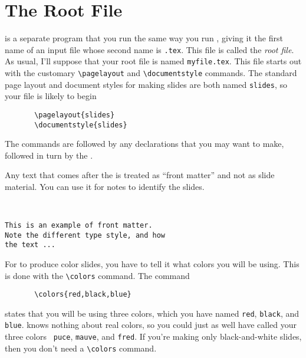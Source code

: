 \section{The Root File}

\SLITEX{} is a separate program that you run the same way you run
\LATEX{}, giving it the first name of an input file whose second name
is \xsp{}\mbox{\tt .tex}\Xsp.  This file is called the {\it root
 file}.  As usual, I'll suppose that your root file
is named \xsp{}\mbox{\tt myfile.tex}\Xsp.  This file
starts out with the customary
\xsp\hbox{\verb"\pagelayout"}\xsp{} 
and \linebreak %
\xsp{}\hbox{\verb"\documentstyle"}\xsp{}
commands.  The standard page layout and document styles for making
slides are both named \xsp{}\mbox{\tt slides}\Xsp, so your file is likely to begin
\begin{verbatim}
       \pagelayout{slides}
       \documentstyle{slides}
\end{verbatim}
The commands are followed by any declarations that you may want to
make, followed in turn by the \xsp{}\hbox{\verb""}\Xsp.

Any text that comes after the \xsp{}\hbox{\verb""}\xsp{}
is treated as
``front  matter''
and not as slide material.  You can use it for notes to
identify the slides.   
\begin{exambox}
\midbox
\begin{verbatim}


This is an example of front matter.
Note the different type style, and how 
the text ...
\end{verbatim}
\end{exambox}

For \SLITEX{} to produce color slides, you have to tell it what colors
you will be using.  This is done with the
\xsp{}\hbox{\verb"\colors"}\xsp{} command.  The command
\begin{verbatim}
       \colors{red,black,blue}
\end{verbatim}
states that you will be using three colors, which you have named
\xsp{}\mbox{\tt red}\Xsp, \xsp{}\mbox{\tt black}\Xsp, and
\xsp{}\mbox{\tt blue}\Xsp.  \SLITEX{} knows nothing about real colors,
so you could just as well have called your three colors \mbox{\tt
puce}, \mbox{\tt mauve}, and \mbox{\tt fred}.  If you're making only
black-and-white slides, then you don't need a
\xsp{}\hbox{\verb"\colors"}\xsp{} command.

